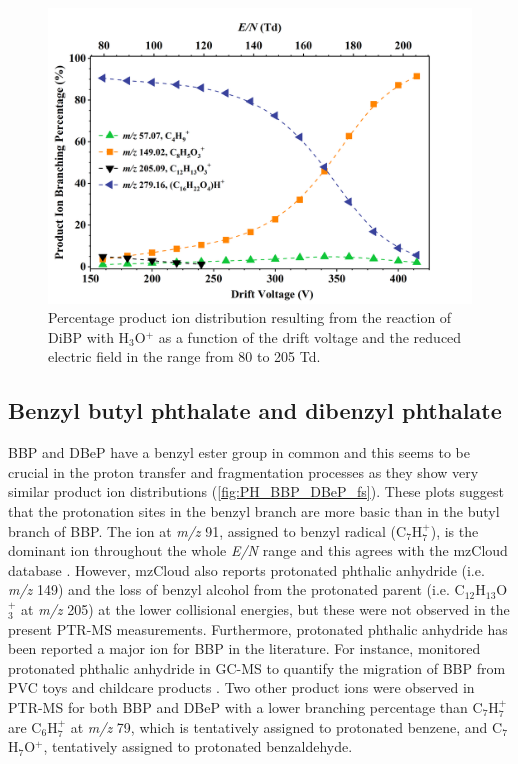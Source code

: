\begin{figure}[htb]%
\centering
\includegraphics[height=0.4\textheight]{pics/DiBP-BR.png}
\caption{Percentage product ion distribution resulting from the reaction of DiBP with H$_3$O$^+$ as a function of the drift voltage and the reduced electric field in the range from 80 to 205 Td.}
\label{fig:PH_DiBP_fs}
\end{figure}





\subsection{Benzyl butyl phthalate
and dibenzyl phthalate}

BBP and DBeP have a benzyl ester group in common and this seems to be crucial in the proton transfer and fragmentation processes as they show very similar product ion distributions (\autoref{fig:PH_BBP_DBeP_fs}). 
These plots suggest that the protonation sites in the benzyl branch are more basic than in the butyl branch  of BBP.
%
The ion at \textit{m/z} 91, assigned to benzyl radical (C$_7$H$_7^+$), is the dominant ion throughout the whole \textit{E/N} range and this agrees with the mzCloud database \cite{mzcloudBBP}.
%
However, mzCloud also reports protonated phthalic anhydride (i.e. \textit{m/z} 149) and the loss of benzyl alcohol from the protonated parent (i.e. C$_{12}$H$_{13}$O$_3^+$ at \textit{m/z} 205) at the lower collisional energies, but these were not observed in the present PTR-MS measurements. 
%
Furthermore, protonated phthalic anhydride has been reported a major ion for BBP in the literature. For instance, \citeauthor{earls2003gas} monitored protonated phthalic anhydride  in GC-MS to quantify the migration of BBP from PVC toys and childcare products \cite{earls2003gas}.
%
Two other product ions were observed in PTR-MS for both BBP and DBeP with a lower branching percentage than C$_7$H$_7^+$ are
C$_6$H$_7^+$ at \textit{m/z} 79, which is tentatively assigned to protonated benzene, 
and C$_7$H$_7$O$^+$, tentatively assigned to protonated benzaldehyde.

